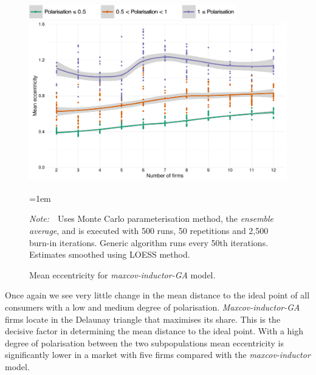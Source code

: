 \documentclass[preprint, 12pt]{elsarticle}
\newcommand{\Figtext}[1]{%
	\begin{tablenotes}[para,flushleft]
		\hangindent=1em
		\footnotesize
		\raggedright
		#1
	\end{tablenotes}
}
\newcommand{\Fignote}[1]{\Figtext{\emph{Note:~}~#1}}
\begin{document}
\begin{figure}[ht!]
	\centering
	\includegraphics[width=90mm]{Graphics/legend_pol.pdf}
	\includegraphics[width=\textwidth]{Graphics/fig621a.pdf}
	\caption{Mean eccentricity for \emph{maxcov-inductor-GA} model.}
	\label{fig:eccentricity_miga}
	\Fignote{Uses Monte Carlo parameterisation method, the \emph{ensemble average}, and is executed with 500 runs, 50 repetitions and 2,500 burn-in iterations. Generic algorithm runs every 50th iterations. Estimates smoothed using LOESS method.}
\end{figure}

Once again we see very little change in the mean distance to the ideal point of all consumers with a low and medium degree of polarisation. \emph{Maxcov-inductor-GA} firms locate in the Delaunay triangle that maximises its share. This is the decisive factor in determining the mean distance to the ideal point. With a high degree of polarisation between the two subpopulations mean eccentricity is significantly lower in a market with five firms compared with the \emph{maxcov-inductor} model.
\end{document}
